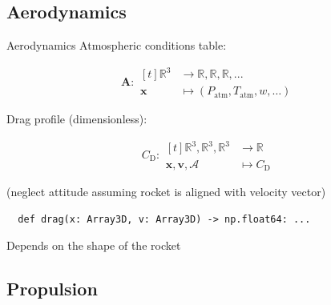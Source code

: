 \documentclass{beamer}
\begin{document}
\subsection{Aerodynamics}
\begin{frame}[fragile]{Aerodynamics}
  Atmospheric conditions table:

  \begin{equation}
    \mathbf A:
    \begin{aligned}[t]
      \mathbb R^3 & \to \mathbb R, \mathbb R, \mathbb R, ... \\
      \mathbf x & \mapsto (P_\text{atm}, T_\text{atm}, w, \ldots)
    \end{aligned}
  \end{equation}

  \vspace{\baselineskip}

  Drag profile (dimensionless):

  \begin{equation}
    C_\text{D}:
    \begin{aligned}[t]
      \mathbb R^3, \mathbb R^3, \mathbb R^3 & \to \mathbb R \\
      \mathbf x, \mathbf v, \mathcal A & \mapsto C_\text{D}
    \end{aligned}
  \end{equation}

  (neglect attitude assuming rocket is aligned with velocity vector)

  \vspace{\baselineskip}

  \begin{lstlisting}
  def drag(x: Array3D, v: Array3D) -> np.float64: ...
  \end{lstlisting}

  Depends on the shape of the rocket
\end{frame}

\subsection{Propulsion}
\end{document}
